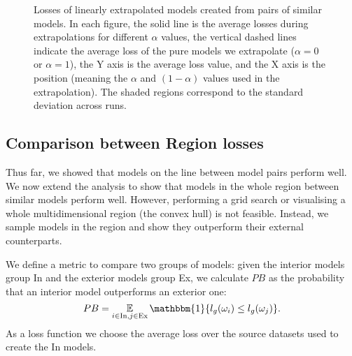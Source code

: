 \documentclass[nohyperref]{article}
\theoremstyle{plain}
\theoremstyle{definition}
\theoremstyle{remark}
\begin{document}
\begin{figure*}[t]
\centering
{}
\hfill
{}
\hfill
{}
\caption{Losses of linearly extrapolated models created from pairs of similar models. In each figure, the solid line is the average losses during extrapolations for different $ \alpha $ values, the vertical dashed lines indicate the average loss of the pure models we extrapolate ($\alpha=0$ or $\alpha=1$), the Y axis is the average loss value, and the X axis is the position (meaning the $ \alpha$ and $(1-\alpha) $ values used in the extrapolation). The shaded regions correspond to the standard deviation across runs.}
\label{fig:extrapolation}
\end{figure*}


\subsection{Comparison between Region losses}\label{sec:loss_metric}

Thus far, we showed that models on the line between model pairs perform well. We now extend the analysis to show that models in the whole region between similar models perform well. However, performing a grid search or visualising a whole multidimensional region (the convex hull) is not feasible. Instead, we sample models in the region and show they outperform their external counterparts. 

We define a metric to compare two groups of models: given the interior models group In and the exterior models group Ex, we calculate $PB$ as the probability that an interior model outperforms an exterior one:
\begin{equation*}\label{equation:PB}
PB=\mathop{{}\mathbb{E}}_{i\in \text{In}, j\in \text{Ex}}\mathbbm{1}\{l_g(\omega_i)\le l_g(\omega_j)\}.    
\end{equation*}
As a loss function we choose the average loss over the source datasets used to create the In models.
\end{document}
